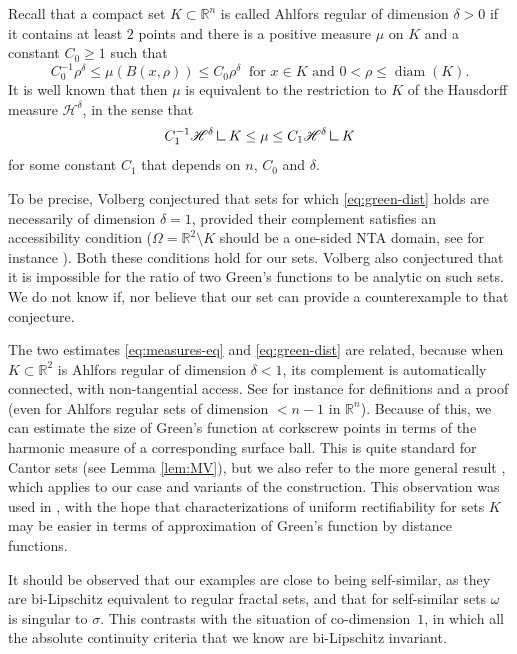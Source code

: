 \documentclass[JEP,XML,SOM,Unicode,published]{cedram}
\let\backslash\setminus
\numberwithin{equation}{section}
\theoremstyle{plain}
\theoremstyle{definition}
\newcommand{\R}{\mathbb{R}}
\newcommand{\R}{\mathbb{R}}
\renewcommand{\H}{\mathscr{H}}
\DeclareMathOperator{\diam}{diam}
\newcommand{\mres}{\mathbin{\vrule height 1.6ex depth 0pt width
0.13ex\vrule height 0.13ex depth 0pt width 1.3ex}}
\begin{document}
Recall that a compact set $K \subset \R^n$ is called Ahlfors regular
of dimension $\delta >0$ if it contains at least $2$ points and
there is a positive measure $\mu$ on $K$ and a constant $C_0 \geq 1$ such that
\begin{equation}\label{1a1}
C_0^{-1} \rho^\delta \leq \mu(B(x,\rho)) \leq C_0 \rho^\delta
\ \text{ for $x\in K$ and } 0 < \rho \leq \diam(K).
\end{equation}
It is well known that then $\mu$ is equivalent to the restriction to $K$
of the Hausdorff measure $\H^\delta$, in the sense that
\begin{equation}\label{1a2}
C_1^{-1} \H^\delta \mres K \leq \mu \leq C_1 \H^\delta \mres K
\end{equation}
for some constant $C_1$ that depends on $n$, $C_0$ and $\delta$.

To be precise, Volberg conjectured that sets for which \eqref{eq:green-dist} holds are necessarily of dimension $\delta=1$, provided their complement satisfies an accessibility condition ($\Omega=\R^2\backslash K$ should be a one-sided NTA domain, see for instance \cite{DFM-Memoirs}).
Both these conditions hold for our sets.
Volberg also conjectured that it is impossible for the ratio of two Green's functions to be analytic on such sets. We do not know if, nor believe that our set can provide a counterexample to that conjecture.

The two estimates \eqref{eq:measures-eq} and \eqref{eq:green-dist}
are related, because when $K \subset \R^2$ is Ahlfors regular of dimension
$\delta < 1$, its complement is automatically connected, with non-tangential access.
See for instance \cite[\S2]{DFM-Memoirs}
for definitions and a proof (even for Ahlfors regular sets of dimension $< n-1$ in $\R^n$).
Because of this, we can estimate the size of Green's function at
corkscrew points in terms of the harmonic measure of a corresponding surface ball.
This is quite standard for Cantor sets (see Lemma \ref{lem:MV}), but we also refer to the more general result
\cite[Lem.\,15.28]{DFM-Mixed},
which applies to our case and variants of the construction.
This observation was used in \cite{DM-Compactness},
with the hope that characterizations of uniform rectifiability for sets $K$ may
be easier in terms of approximation of Green's function by distance functions.

It should be observed that our examples are close to being self-similar, as
they are bi-Lipschitz equivalent to regular fractal sets, and that for self-similar sets
$\omega$ is singular to $\sigma$.
This contrasts with the situation of co-dimension~$1$,
in which all the absolute continuity criteria that we know are bi-Lipschitz invariant.
\end{document}
